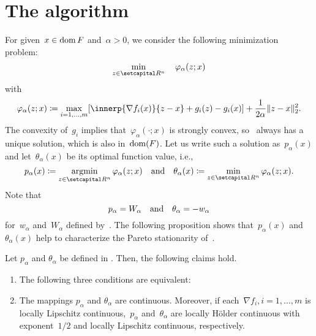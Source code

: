 \documentclass[../main]{subfiles}
\begin{document}
\section{The algorithm} 
For given~$x \in \operatorname{dom} F$ and~$\alpha > 0$, we consider the following minimization problem:
\begin{equation} \label{eq:pgm_subproblem}
    \min_{z \in \setR^n} \quad \varphi_\alpha(z; x)
\end{equation}
with
\begin{equation} \label{eq:pgm_obj}
    \varphi_\alpha(z; x) \coloneqq \max_{i = 1, \dots, m} [ \innerp{\nabla f_i(x)}{z - x} + g_i(z) - g_i(x) ] + \frac{1}{2 \alpha} \norm{ z - x }_2^2
.\end{equation}
The convexity of~$g_i$ implies that~$\varphi_\alpha(\cdot; x)$ is strongly convex, so~ always has a unique solution, which is also in~$\operatorname{dom}(F)$.
Let us write such a solution as~$p_\alpha(x)$ and let~$\theta_\alpha(x)$ be its optimal function value, i.e.,
\begin{equation} \label{eq:pgm_optimal_function}
    p_\alpha(x) \coloneqq \argmin_{z \in \setR^n} \varphi_\alpha(z; x) \eqand \theta_\alpha(x) \coloneqq \min_{z \in \setR^n} \varphi_\alpha(z; x)
.\end{equation}
Note that
\begin{equation} \label{eq:pgm_merit}
    p_\alpha = W_\alpha \quad \text{and} \quad \theta_\alpha = - w_\alpha
\end{equation}
for~$w_\alpha$ and~$W_\alpha$ defined by~.
The following proposition shows that~$p_\alpha(x)$ and~$\theta_\alpha(x)$ help to characterize the Pareto stationarity of~.
\begin{lemma} 
    Let $p_\alpha$ and $\theta_\alpha$ be defined in .
    Then, the following claims hold.
	\begin{enumerate}
        \item The following three conditions are equivalent:
             
		\item The mappings $p_\alpha$ and $\theta_\alpha$ are continuous.
            Moreover, if each~$\nabla f_i, i = 1, \dots, m$ is locally Lipschitz continuous,~$p_\alpha$ and~$\theta_\alpha$ are locally H\"older continuous with exponent~$1 / 2$ and locally Lipschitz continuous, respectively. 
	\end{enumerate}
\end{lemma}
\end{document}
